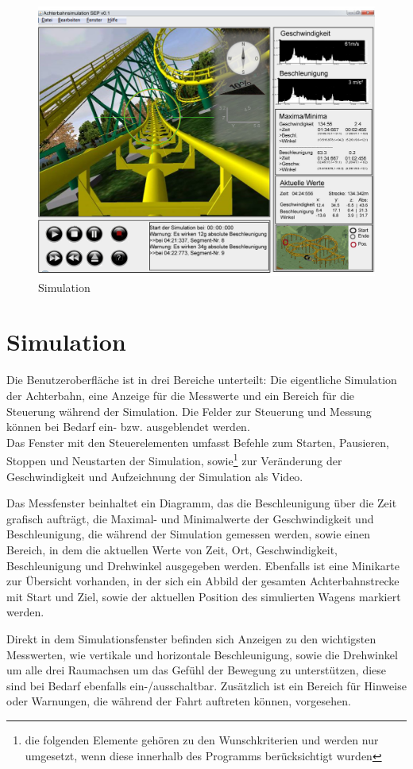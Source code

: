 \begin{figure}[!h]%
\includegraphics[width=0.8\linewidth]{./bilder/GUI_v2.jpg}%
\caption{Simulation}%
\label{Simulation}%
\end{figure}
\section*{Simulation}

Die Benutzeroberfläche ist in drei Bereiche unterteilt: Die eigentliche Simulation der Achterbahn, eine Anzeige für die Messwerte und ein Bereich für die Steuerung während der Simulation. Die Felder zur Steuerung und Messung können bei Bedarf ein- bzw. ausgeblendet werden.\\
Das Fenster mit den Steuerelementen umfasst Befehle zum Starten, Pausieren, Stoppen und Neustarten der Simulation, sowie\footnote{die folgenden Elemente gehören zu den Wunschkriterien und werden nur umgesetzt, wenn diese innerhalb des Programms berücksichtigt wurden} zur Veränderung der Geschwindigkeit und Aufzeichnung der Simulation als Video.

Das Messfenster beinhaltet ein Diagramm, das die Beschleunigung über die Zeit grafisch aufträgt, die Maximal- und Minimalwerte der Geschwindigkeit und Beschleunigung, die während der Simulation gemessen werden, sowie einen Bereich, in dem die aktuellen Werte von Zeit, Ort, Geschwindigkeit, Beschleunigung und Drehwinkel ausgegeben werden.
Ebenfalls ist eine Minikarte zur Übersicht vorhanden, in der sich ein Abbild der gesamten Achterbahnstrecke mit Start und Ziel, sowie der aktuellen Position des simulierten Wagens markiert werden.

Direkt in dem Simulationsfenster befinden sich Anzeigen zu den wichtigsten Messwerten, wie vertikale und horizontale Beschleunigung, sowie die Drehwinkel um alle drei Raumachsen um das Gefühl der Bewegung zu unterstützen, diese sind bei Bedarf ebenfalls ein-/ausschaltbar. Zusätzlich ist ein Bereich für Hinweise oder Warnungen, die während der Fahrt auftreten können, vorgesehen. 


